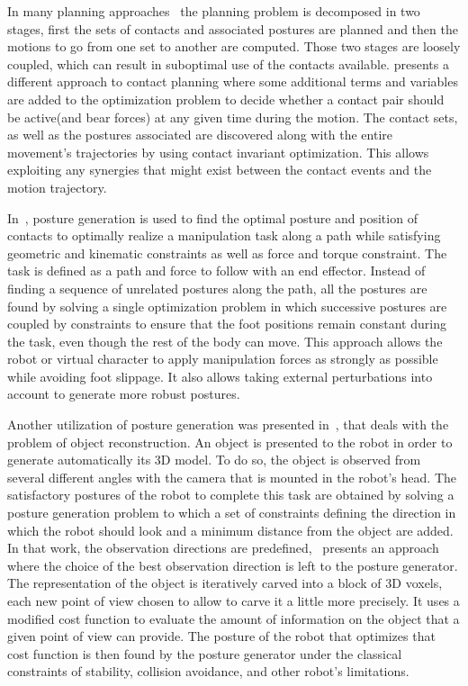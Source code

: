 In many planning approaches~\cite{kuffner2005motion, chestnutt2007navigation, hauser:ijrr:2008, kolter2008control, bouyarmane:icra:2011} the planning problem is decomposed in two stages, first the sets of contacts and associated postures are planned and then the motions to go from one set to another are computed.
Those two stages are loosely coupled, which can result in suboptimal use of the contacts available.
\cite{mordatch:acm:2012} presents a different approach to contact planning where some additional terms and variables are added to the optimization problem to decide whether a contact pair should be active(and bear forces) at any given time during the motion.
The contact sets, as well as the postures associated are discovered along with the entire movement's trajectories by using contact invariant optimization.
This allows exploiting any synergies that might exist between the contact events and the motion trajectory.

In~\cite{liu:acm:2012}, posture generation is used to find the optimal posture and position of contacts to optimally realize a manipulation task along a path while satisfying geometric and kinematic constraints as well as force and torque constraint.
The task is defined as a path and force to follow with an end effector.
Instead of finding a sequence of unrelated postures along the path, all the postures are found by solving a single optimization problem in which successive postures are coupled by constraints to ensure that the foot positions remain constant during the task, even though the rest of the body can move.
This approach allows the robot or virtual character to apply manipulation forces as strongly as possible while avoiding foot slippage.
It also allows taking external perturbations into account to generate more robust postures.

Another utilization of posture generation was presented in~\cite{stasse:humanoids:2007}, that deals with the problem of object reconstruction.
An object is presented to the robot in order to generate automatically its 3D model.
To do so, the object is observed from several different angles with the camera that is mounted in the robot's head.
The satisfactory postures of the robot to complete this task are obtained by solving a posture generation problem to which a set of constraints defining the direction in which the robot should look and a minimum distance from the object are added.
In that work, the observation directions are predefined,~\cite{foissotte:humanoids:2008} presents an approach where the choice of the best observation direction is left to the posture generator.
The representation of the object is iteratively carved into a block of 3D voxels, each new point of view chosen to allow to carve it a little more precisely.
It uses a modified cost function to evaluate the amount of information on the object that a given point of view can provide.
The posture of the robot that optimizes that cost function is then found by the posture generator under the classical constraints of stability, collision avoidance, and other robot's limitations.



